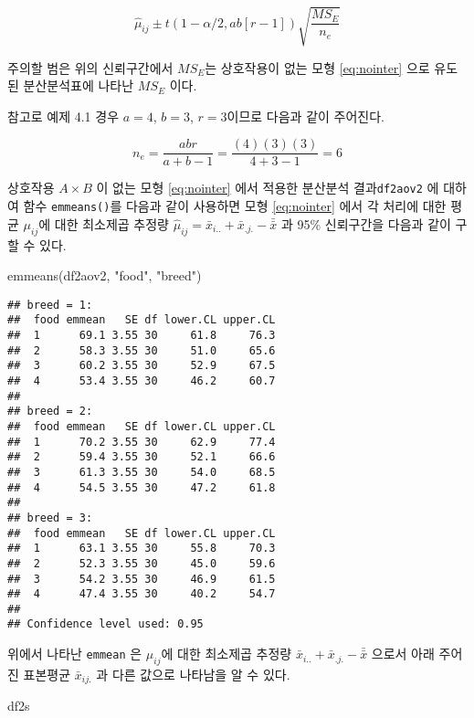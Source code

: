 \documentclass[
]{book}
\newenvironment{Shaded}{\begin{snugshade}}{\end{snugshade}}
\newcommand{\FunctionTok}[1]{\textcolor[rgb]{0.00,0.00,0.00}{#1}}
\newcommand{\NormalTok}[1]{#1}
\newcommand{\StringTok}[1]{\textcolor[rgb]{0.31,0.60,0.02}{#1}}
\begin{document}
\[ \hat \mu_{ij} \pm t(1-\alpha/2, ab[r-1]) \sqrt{ \frac{MS_E}{n_e}} \]

주의할 범은 위의 신뢰구간에서 \(MS_E\)는 상호작용이 없는 모형 \eqref{eq:nointer} 으로 유도된 분산분석표에 나타난 \(MS_E\) 이다.

참고로 예제 4.1 경우 \(a=4\), \(b=3\), \(r=3\)이므로 다음과 같이 주어진다.

\[ n_e = \frac{abr}{a+b-1} = \frac{(4)(3)(3)}{4+3-1} = 6  \]

상호작용 \(A \times B\) 이 없는 모형 \eqref{eq:nointer} 에서 적용한 분산분석 결과\texttt{df2aov2} 에 대하여 함수 \texttt{emmeans()}를 다음과 같이 사용하면 모형 \eqref{eq:nointer} 에서 각 처리에 대한 평균 \(\mu_{ij}\)에 대한 최소제곱 추정량 \(\hat \mu_{ij}=\bar x_{i..} + \bar x_{.j.} - \bar{\bar x}\) 과 95\% 신뢰구간을 다음과 같이 구할 수 있다.

\begin{Shaded}
\begin{Highlighting}[]
\FunctionTok{emmeans}\NormalTok{(df2aov2, }\StringTok{"food"}\NormalTok{, }\StringTok{"breed"}\NormalTok{)}
\end{Highlighting}
\end{Shaded}

\begin{verbatim}
## breed = 1:
##  food emmean   SE df lower.CL upper.CL
##  1      69.1 3.55 30     61.8     76.3
##  2      58.3 3.55 30     51.0     65.6
##  3      60.2 3.55 30     52.9     67.5
##  4      53.4 3.55 30     46.2     60.7
## 
## breed = 2:
##  food emmean   SE df lower.CL upper.CL
##  1      70.2 3.55 30     62.9     77.4
##  2      59.4 3.55 30     52.1     66.6
##  3      61.3 3.55 30     54.0     68.5
##  4      54.5 3.55 30     47.2     61.8
## 
## breed = 3:
##  food emmean   SE df lower.CL upper.CL
##  1      63.1 3.55 30     55.8     70.3
##  2      52.3 3.55 30     45.0     59.6
##  3      54.2 3.55 30     46.9     61.5
##  4      47.4 3.55 30     40.2     54.7
## 
## Confidence level used: 0.95
\end{verbatim}

위에서 나타난 \texttt{emmean} 은 \(\mu_{ij}\)에 대한 최소제곱 추정량 \(\bar x_{i..} + \bar x_{.j.} - \bar{\bar x}\) 으로서 아래 주어진 표본평균 \(\bar x_{ij.}\) 과 다른 값으로 나타남을 알 수 있다.

\begin{Shaded}
\begin{Highlighting}[]
\NormalTok{df2s}
\end{Highlighting}
\end{Shaded}
\end{document}
